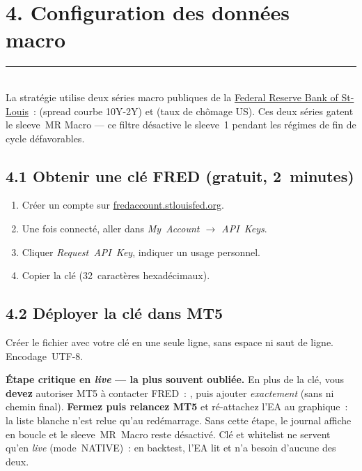 \documentclass[11pt, a4paper]{scrartcl}
\begin{document}
\section*{4. Configuration des données macro}
\vspace{-0.4em}
{\color{accent}\rule{\linewidth}{1.0pt}}\\[0.4em]

La stratégie utilise deux séries macro publiques de la \href{https://fred.stlouisfed.org/}{Federal Reserve Bank of St-Louis}~:
 (spread courbe 10Y-2Y) et  (taux de chômage US).
Ces deux séries gatent le sleeve~MR Macro --- ce filtre désactive le
sleeve~1 pendant les régimes de fin de cycle défavorables.

\subsection*{4.1 Obtenir une clé FRED (gratuit, 2~minutes)}

\begin{enumerate}
\item Créer un compte sur \href{https://fredaccount.stlouisfed.org/login/secure/}{fredaccount.stlouisfed.org}.
\item Une fois connecté, aller dans \emph{My~Account $\rightarrow$ API~Keys}.
\item Cliquer \emph{Request~API~Key}, indiquer un usage personnel.
\item Copier la clé (32~caractères hexadécimaux).
\end{enumerate}

\subsection*{4.2 Déployer la clé dans MT5}

Créer le fichier  avec votre clé
en une seule ligne, sans espace ni saut de ligne. Encodage~UTF-8.

\begin{warningbox}
\textbf{Étape critique en \emph{live} --- la plus souvent oubliée.} En plus de la
clé, vous \textbf{devez} autoriser MT5 à contacter FRED~:
, puis ajouter \emph{exactement}
 (sans \code{/} ni chemin final).
\textbf{Fermez puis relancez MT5} et ré-attachez l'EA au graphique~: la liste
blanche n'est relue qu'au redémarrage. Sans cette étape, le journal affiche
 en boucle et le sleeve~MR~Macro reste désactivé.
Clé et whitelist ne servent qu'en \emph{live} (mode~NATIVE)~: en backtest, l'EA lit
 et n'a besoin d'aucune des deux.
\end{warningbox}
\end{document}

